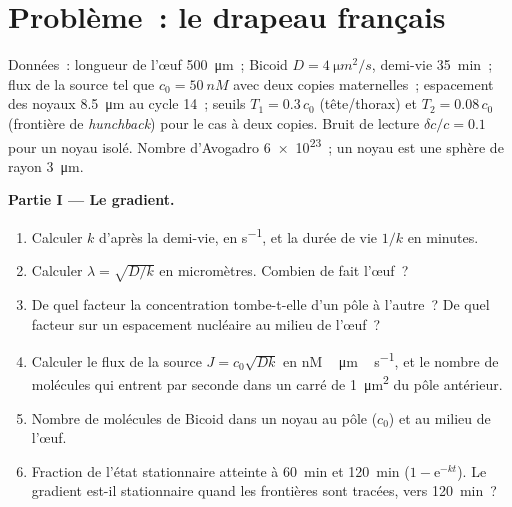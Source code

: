 \section{Problème~: le drapeau français}

\begin{problem}
\label{pb:b3:developmental-genetics:1}
Données~: longueur de l'œuf \qty{500}{\micro m}~; Bicoid $D = \qty{4}{\micro m^2/s}$,
demi-vie \qty{35}{min}~; flux de la source tel que $c_{0} = \qty{50}{nM}$
avec deux copies maternelles~; espacement des noyaux \qty{8.5}{\micro m}
au cycle 14~; seuils $T_{1} = 0.3\,c_{0}$ (tête/thorax) et $T_{2} =
0.08\,c_{0}$ (frontière de \emph{hunchback}) pour le cas à deux copies.
Bruit de lecture $\delta c/c = 0.1$ pour un noyau isolé. Nombre
d'Avogadro \qty{6e23}{}~; un noyau est une sphère de rayon \qty{3}{\micro m}.

\medskip
\noindent\textbf{Partie I --- Le gradient.}
\begin{enumerate}
  \item Calculer $k$ d'après la demi-vie, en \unit{s^{-1}}, et la durée
        de vie $1/k$ en minutes.
  \item Calculer $\lambda = \sqrt{D/k}$ en micromètres. Combien de
         fait l'œuf~?
  \item De quel facteur la concentration tombe-t-elle d'un pôle à
        l'autre~? De quel facteur sur un espacement nucléaire au milieu
        de l'œuf~?
  \item Calculer le flux de la source $J = c_{0}\sqrt{Dk}$ en
        \unit{nM\,\micro m\,s^{-1}}, et le nombre de molécules qui
        entrent par seconde dans un carré de \qty{1}{\micro m^2} du pôle
        antérieur.
  \item Nombre de molécules de Bicoid dans un noyau au pôle ($c_{0}$) et
        au milieu de l'œuf.
  \item Fraction de l'état stationnaire atteinte à \qty{60}{min} et
        \qty{120}{min} ($1 - \mathrm{e}^{-kt}$). Le gradient est-il
        stationnaire quand les frontières sont tracées, vers
        \qty{120}{min}~?
\end{enumerate}


\end{problem}
